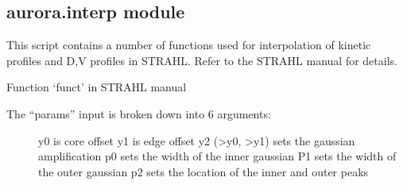 \documentclass[letterpaper,10pt,english]{sphinxmanual}
\begin{document}
\subsection{aurora.interp module}
\label{\detokenize{aurora:module-aurora.interp}}\label{\detokenize{aurora:aurora-interp-module}}
This script contains a number of functions used for interpolation of kinetic profiles and D,V profiles in STRAHL.
Refer to the STRAHL manual for details.

\begin{fulllineitems}
\label{\detokenize{aurora:aurora.interp.exppol0}}
\end{fulllineitems}


\begin{fulllineitems}
\label{\detokenize{aurora:aurora.interp.exppol1}}
\end{fulllineitems}


\begin{fulllineitems}
\label{\detokenize{aurora:aurora.interp.funct}}
Function ‘funct’ in STRAHL manual
\begin{description}
\item[{The “params” input is broken down into 6 arguments:}] \leavevmode
y0 is core offset
y1 is edge offset
y2 (\textgreater{}y0, \textgreater{}y1) sets the gaussian amplification
p0 sets the width of the inner gaussian
P1 sets the width of the outer gaussian
p2 sets the location of the inner and outer peaks

\end{description}

\end{fulllineitems}
\end{document}
